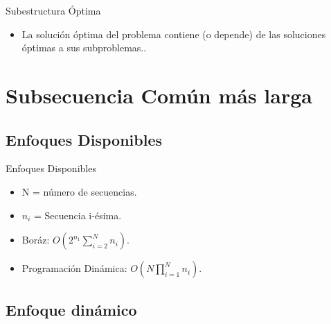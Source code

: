\documentclass{beamer}
\begin{document}
		\begin{frame}{Subestructura Óptima}
 			\begin{itemize}
			
  				\item La solución óptima del problema contiene (o depende) de las soluciones óptimas a sus subproblemas..

			\end{itemize}
		\end{frame}
			

	\section{Subsecuencia Común más larga}

		\subsection{Enfoques Disponibles}
	
			\begin{frame}{Enfoques Disponibles}
 			
				\begin{itemize}
			
					\item N = número de secuencias.
				
					\item $n_{i} $ = Secuencia i-ésima.

  					\item Boráz: $O(2^{n_{1}}\sum_{i = 2}^{N}n_{i})$.
  			
					\item Programación Dinámica: $O(N\prod_{i = 1}^{N}n_{i})$.
  					
				\end{itemize}
			
			\end{frame}

		\subsection{Enfoque dinámico}
		
\end{document}
